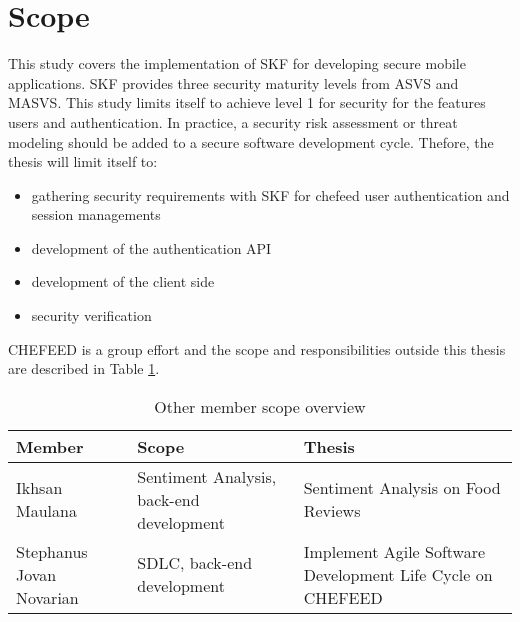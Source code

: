 \section{Scope}
This study covers the implementation of SKF for developing secure mobile applications. SKF provides three security maturity levels from ASVS and MASVS. This study limits itself to achieve level 1 for security for the features users and authentication. In practice, a security risk assessment or threat modeling should be added to a secure software development cycle. Thefore, the thesis will limit itself to: 

\begin{itemize}
    \item gathering security requirements with SKF for chefeed user authentication and session managements
    \item development of the authentication API
    \item  development of the client side
    \item security verification
\end{itemize}


CHEFEED is a group effort and the scope and responsibilities outside this thesis are described in Table \ref{tab:member-scope}.

\begin{table}[!h]
    \centering
    \caption{Other member scope overview}
    \label{tab:member-scope}
    \begin{tabular}{|l|p{10em}|p{12em}|}
        \hline
        \textbf{Member} & \textbf{Scope} & \textbf{Thesis} \\
        \hline
        Ikhsan Maulana & Sentiment Analysis, back-end development & Sentiment Analysis on Food Reviews \\
        \hline
        Stephanus Jovan Novarian & SDLC, back-end development & Implement Agile Software Development Life Cycle on CHEFEED \\
        \hline
    \end{tabular}
\end{table}
